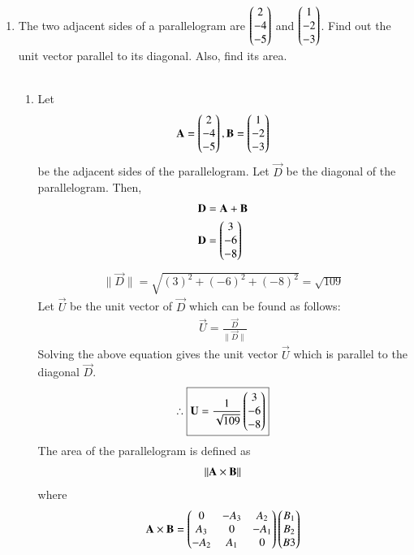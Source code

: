\documentclass[journal,12pt,twocolumn]{IEEEtran}
\renewcommand\thesection{\arabic{section}}
\begin{document}
\begin{enumerate}[label=\thesection.\arabic*.,ref=\thesection.\theenumi]
\item The two adjacent sides of a parallelogram are $\begin{pmatrix}2\\-4\\-5\end{pmatrix}$ and $\begin{pmatrix}1\\-2\\-3\end{pmatrix}$. Find out the unit vector parallel to its diagonal. Also, find its area.\\\\
\solution
\begin{enumerate}
    \item Let 
    \begin{align}
        \mathbf{A}=\begin{pmatrix}2\\-4\\-5\end{pmatrix}, \mathbf{B}=\begin{pmatrix}1\\-2\\-3\end{pmatrix}
    \end{align}
    be the adjacent sides of the parallelogram. Let $\vec{D}$ be the diagonal of the parallelogram. Then,
    \begin{align}
        \mathbf{D}&=\mathbf{A}+\mathbf{B}\\
        \mathbf{D}&=\begin{pmatrix}3\\-6\\-8\end{pmatrix}
    \end{align}
   \begin{align}
       \|\vec{D}\|=\sqrt{(3)^2+(-6)^2+(-8)^2}=\sqrt{109}
   \end{align}
   Let $\vec{U}$ be the unit vector of $\vec{D}$ which can be found as follows:
   \begin{align}
       \vec{U}=\frac{\vec{D}}{\|\vec{D}\|}
   \end{align}
Solving the above equation gives the unit vector $\vec{U}$ which is parallel to the diagonal $\vec{D}$.\\
\begin{align}\therefore
    \boxed
    {\mathbf{U}=\frac{1}{\sqrt{109}}\begin{pmatrix}3\\-6\\-8\end{pmatrix}}
\end{align}
   The area of the parallelogram is defined as
   \begin{align}
       \left\lVert\mathbf{A}\times\mathbf{B}\right\rVert
   \end{align}
   where
   \begin{align}
       \vec{A}\times\vec{B}&=\myvec{0&-A_3&A_2\\A_3&0&-A_1\\-A_2&A_1&0}\myvec{B_1\\B_2\\B3}\\ 

\end{align}
\end{enumerate}
\end{enumerate}
\end{document}
